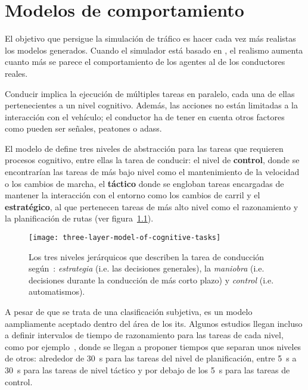 \chapter{Modelos de comportamiento}
\label{ch:sota-behavior-models}

El objetivo que persigue la simulación de tráfico es hacer cada vez más realistas los modelos generados. Cuando el simulador está basado en , el realismo aumenta cuanto más se parece el comportamiento de los agentes al de los conductores reales.

Conducir implica la ejecución de múltiples tareas en paralelo, cada una de ellas pertenecientes a un nivel cognitivo. Además, las acciones no están limitadas a la interacción con el vehículo; el conductor ha de tener en cuenta otros factores como pueden ser señales, peatones o \glspl{adas}.

El modelo de \cite{michon1985critical} define tres niveles de abstracción para las tareas que requieren procesos cognitivo, entre ellas la tarea de conducir: el nivel de \textbf{control}, donde se encontrarían las tareas de más bajo nivel como el mantenimiento de la velocidad o los cambios de marcha, el \textbf{táctico} donde se engloban tareas encargadas de mantener la interacción con el entorno como los cambios de carril y el \textbf{estratégico}, al que pertenecen tareas de más alto nivel como el razonamiento y la planificación de rutas (ver figura~\ref{fig:three-levels-of-human-driving}).

\begin{figure}
	\centering
	\texttt{[image: three-layer-model-of-cognitive-tasks]}
	\caption[Los tres niveles jerárquicos de conducción según~\cite{michon1985critical}]{Los tres niveles jerárquicos que describen la tarea de conducción según~\cite{michon1985critical}: \textit{estrategia} (i.e. las decisiones generales), la \textit{maniobra} (i.e. decisiones durante la conducción de más corto plazo) y \textit{control} (i.e. automatismos).}
	\label{fig:three-levels-of-human-driving}
\end{figure}

A pesar de que se trata de una clasificación subjetiva, es un modelo aampliamente aceptado dentro del área de los \gls{its}. Algunos estudios llegan incluso a definir intervalos de tiempo de razonamiento para las tareas de cada nivel, como por ejemplo~\cite{Alexiadis2004}, donde se llegan a proponer tiempos que separan unos niveles de otros: alrededor de \SI{30}{\second} para las tareas del nivel de planificación, entre \SI{5}{\second} a \SI{30}{\second} para las tareas de nivel táctico y por debajo de los \SI{5}{\second} para las tareas de control.

